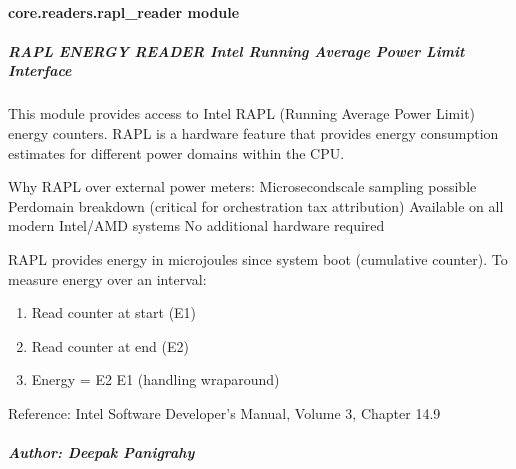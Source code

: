 \documentclass[letterpaper,10pt,english]{sphinxmanual}
\begin{document}
\sphinxstepscope


\paragraph{core.readers.rapl\_reader module}
\label{\detokenize{core.readers.rapl_reader:module-core.readers.rapl_reader}}\label{\detokenize{core.readers.rapl_reader:core-readers-rapl-reader-module}}\label{\detokenize{core.readers.rapl_reader::doc}}

\subparagraph{RAPL ENERGY READER \sphinxhyphen{} Intel Running Average Power Limit Interface}
\label{\detokenize{core.readers.rapl_reader:rapl-energy-reader-intel-running-average-power-limit-interface}}
\sphinxAtStartPar
This module provides access to Intel RAPL (Running Average Power Limit) energy
counters. RAPL is a hardware feature that provides energy consumption estimates
for different power domains within the CPU.

\sphinxAtStartPar
Why RAPL over external power meters:
\sphinxhyphen{} Microsecond\sphinxhyphen{}scale sampling possible
\sphinxhyphen{} Per\sphinxhyphen{}domain breakdown (critical for orchestration tax attribution)
\sphinxhyphen{} Available on all modern Intel/AMD systems
\sphinxhyphen{} No additional hardware required

\sphinxAtStartPar
RAPL provides energy in microjoules since system boot (cumulative counter).
To measure energy over an interval:
\begin{enumerate}
%
\item {} 
\sphinxAtStartPar
Read counter at start (E1)

\item {} 
\sphinxAtStartPar
Read counter at end (E2)

\item {} 
\sphinxAtStartPar
Energy = E2 \sphinxhyphen{} E1 (handling wrap\sphinxhyphen{}around)

\end{enumerate}

\sphinxAtStartPar
Reference: Intel Software Developer’s Manual, Volume 3, Chapter 14.9


\subparagraph{Author: Deepak Panigrahy}
\label{\detokenize{core.readers.rapl_reader:author-deepak-panigrahy}}
\end{document}

